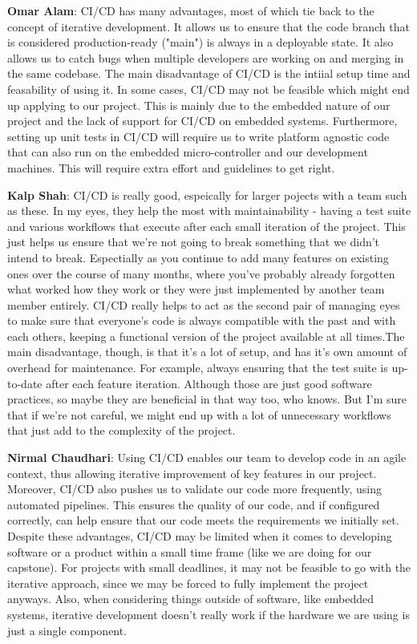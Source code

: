 \documentclass{article}
\begin{document}
\begin{enumerate}
    \textbf{Omar Alam}: CI/CD has many advantages, most of which tie back to the concept of iterative development. It allows us to ensure
    that the code branch that is considered production-ready ("main") is always in a deployable state. It also allows us to catch bugs when multiple 
    developers are working on and merging in the same codebase. The main disadvantage of CI/CD is the intiial setup time and feasability of using it.
    In some cases, CI/CD may not be feasible which might end up applying to our project. This is mainly due to the embedded nature of our project 
    and the lack of support for CI/CD on embedded systems. Furthermore, setting up unit tests in CI/CD will require us to write platform agnostic
    code that can also run on the embedded micro-controller and our development machines. This will require extra effort and guidelines to get right.

    \textbf{Kalp Shah}: CI/CD is really good, espeically for larger pojects with a team such as these. In my eyes, they help the most with
    maintainability - having a test suite and various workflows that execute after each small iteration of the project. This just helps us ensure
    that we're not going to break something that we didn't intend to break. Espectially as you continue to add many features on existing ones over
    the course of many months, where you've probably already forgotten what worked how they work or they were just implemented by another team member
    entirely. CI/CD really helps to act as the second pair of managing eyes to make sure that everyone's code is always compatible with the past and
    with each others, keeping a functional version of the project available at all times.The main disadvantage, though, is that it's a lot of setup,
    and has it's own amount of overhead for maintenance. For example, always ensuring that the test suite is up-to-date after each feature iteration.
    Although those are just good software practices, so maybe they are beneficial in that way too, who knows. But I'm sure that if we're not careful,
    we might end up with a lot of unnecessary workflows that just add to the complexity of the project.
    
    \textbf{Nirmal Chaudhari}: Using CI/CD enables our team to develop code in an agile context, thus allowing iterative improvement of key features in our project.
    Moreover, CI/CD also pushes us to validate our code more frequently, using automated pipelines. 
    This ensures the quality of our code, and if configured correctly, can help ensure that our code meets the requirements we initially set. 
    Despite these advantages, CI/CD may be limited when it comes to developing software or a product within a small time frame (like we are doing for our capstone). 
    For projects with small deadlines, it may not be feasible to go with the iterative approach, since we may be forced to fully implement the project anyways. 
    Also, when considering things outside of software, like embedded systems, iterative development doesn't really work if the hardware we are using is just a single component. 


\end{enumerate}
\end{document}
